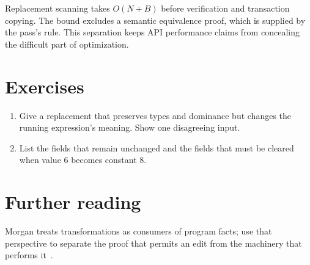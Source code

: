Replacement scanning takes $O(N+B)$ before verification and transaction copying.
The bound excludes a semantic equivalence proof, which is supplied by the pass's rule.
This separation keeps API performance claims from concealing the difficult part of optimization.

\section{Exercises}
\label{sec:pebble-eleven-exercises}
\begin{enumerate}
\item \label{ex:pebble-valid-wrong} Give a replacement that preserves types and dominance but changes the running expression's meaning. Show one disagreeing input.
\item \label{ex:pebble-fold-fields} List the fields that remain unchanged and the fields that must be cleared when value 6 becomes constant 8.
\end{enumerate}

\section{Further reading}
\label{sec:pebble-eleven-reading}
Morgan treats transformations as consumers of program facts; use that perspective to separate the proof that permits an edit from the machinery that performs it~\cite{morgan-1998-optimizing}.
